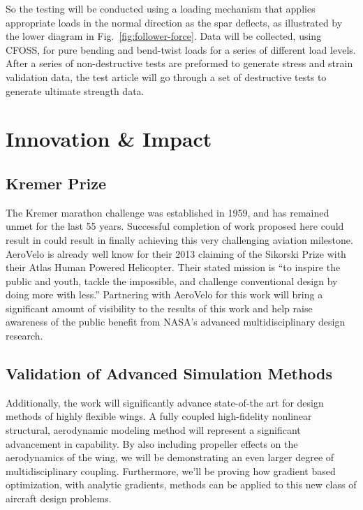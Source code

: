 \documentclass[]{aiaa-tc}
\begin{document}
        So the testing will be conducted using a loading mechanism that applies appropriate loads in the normal direction
        as the spar deflects, as illustrated by the lower diagram in Fig.~\ref{fig:follower-force}. Data will be collected, using CFOSS, for pure bending and bend-twist loads for a series of different 
        load levels. After a series of non-destructive tests are preformed to generate stress and strain validation data, the test 
        article will go through a set of destructive tests to generate ultimate strength data. 


  \section{Innovation \& Impact}

    \subsection{Kremer Prize}
    The Kremer marathon challenge was established in 1959, and has remained unmet for the last 55 years. 
    Successful completion of work proposed here could result in could result in finally achieving this very challenging
    aviation milestone. AeroVelo is already well know for their 2013 claiming of the Sikorski Prize with their Atlas 
    Human Powered Helicopter. Their stated mission is ``to inspire the public and youth, tackle the impossible, and 
    challenge conventional design by doing more with less.'' Partnering with AeroVelo for this work will bring a significant
    amount of visibility to the results of this work and help raise awareness of the public benefit from NASA's advanced 
    multidisciplinary design research. 

    \subsection{Validation of Advanced Simulation Methods}
    Additionally, the work will significantly advance state-of-the art for design methods of highly flexible wings. 
    A fully coupled high-fidelity nonlinear structural, aerodynamic modeling method will represent a significant advancement 
    in capability. By also including propeller effects on the aerodynamics of the wing, we will be demonstrating an even larger 
    degree of multidisciplinary coupling. Furthermore, we'll be proving how gradient based optimization, with analytic gradients, 
    methods can be applied to this new class of aircraft design problems. 
\end{document}
